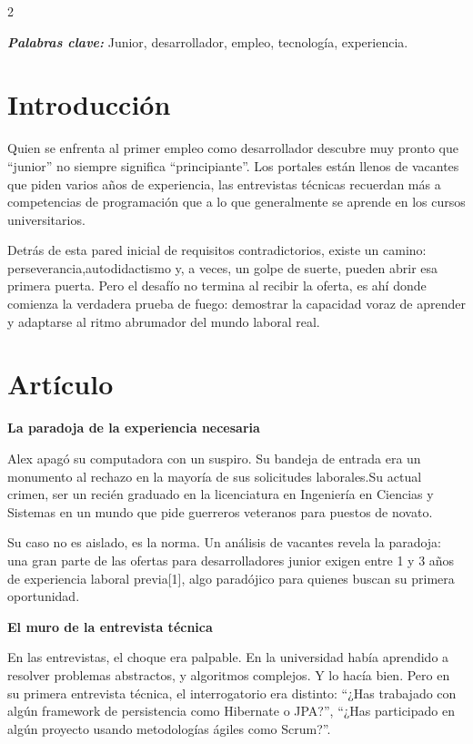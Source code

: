 \documentclass[12pt,spanish,Letterpaper,openany]{book}
\begin{document}
\begin {multicols}{2}

\textbf{\emph{Palabras clave:}} Junior, desarrollador, empleo, tecnología, experiencia.

\section{Introducción}\label{introducciuxf3n-6}

Quien se enfrenta al primer empleo como desarrollador descubre muy pronto que ``junior'' no siempre significa ``principiante''. Los portales están llenos de vacantes que piden varios años de experiencia, las entrevistas técnicas recuerdan más a competencias de programación que a lo que generalmente se aprende en los cursos universitarios.

Detrás de esta pared inicial de requisitos contradictorios, existe un camino: perseverancia,autodidactismo y, a veces, un golpe de suerte, pueden abrir esa primera puerta. Pero el desafío no termina al recibir la oferta, es ahí donde comienza la verdadera prueba de fuego: demostrar la capacidad voraz de aprender y adaptarse al ritmo abrumador del mundo laboral real.

\section{Artículo}\label{artuxedculo-6}

\bigskip

\textbf{La paradoja de la experiencia necesaria}

Alex apagó su computadora con un suspiro. Su bandeja de entrada era un monumento al rechazo en la mayoría de sus solicitudes laborales.Su actual crimen, ser un recién graduado en la licenciatura en Ingeniería en Ciencias y
Sistemas en un mundo que pide guerreros veteranos para puestos de novato.

Su caso no es aislado, es la norma. Un análisis de vacantes revela la paradoja: una gran parte de las ofertas para desarrolladores junior exigen entre 1 y 3 años de experiencia laboral previa{[}1{]}, algo paradójico para quienes buscan su primera oportunidad.

\bigskip

\textbf{El muro de la entrevista técnica}

En las entrevistas, el choque era palpable. En la universidad había aprendido a resolver problemas abstractos, y algoritmos complejos. Y lo hacía bien. Pero en su primera entrevista técnica, el interrogatorio era distinto: ``¿Has
trabajado con algún framework de persistencia como Hibernate o JPA?'', ``¿Has participado en algún proyecto usando metodologías ágiles como Scrum?''.


\end{multicols}
\end{document}
